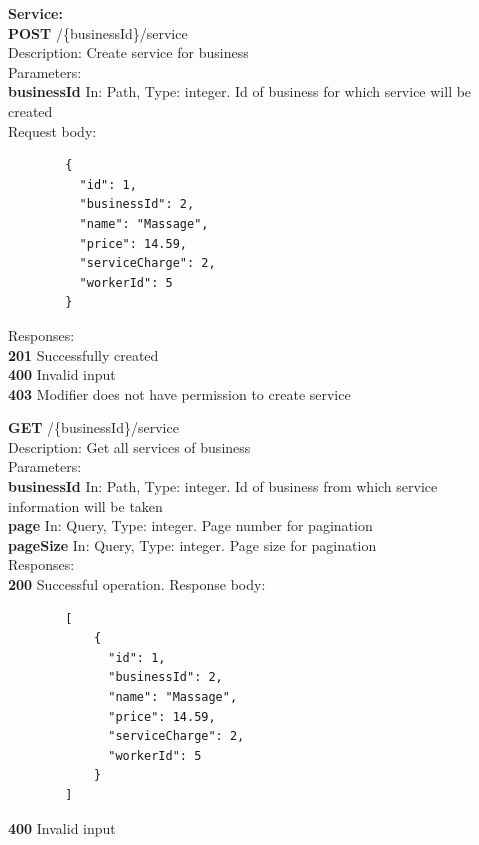 \documentclass[11pt,a4paper,pdftex]{article}
\begin{document}
\textbf{Service:}\\
\hspace*{1em}\textbf{POST} /\{businessId\}/service\\
\hspace*{2em}Description: Create service for business\\
\hspace*{2em}Parameters:\\
\hspace*{3em}\textbf{businessId} In: Path, Type: integer. Id of business for which service will be created\\
\hspace*{2em}Request body:
\begin{verbatim}
        {
          "id": 1,
          "businessId": 2,
          "name": "Massage",
          "price": 14.59,
          "serviceCharge": 2,
          "workerId": 5
        }
\end{verbatim}
\hspace*{2em}Responses:\\
\hspace*{3em}\textbf{201} Successfully created\\
\hspace*{3em}\textbf{400} Invalid input\\
\hspace*{3em}\textbf{403} Modifier does not have permission to create service

\hspace*{1em}\textbf{GET} /\{businessId\}/service\\
\hspace*{2em}Description: Get all services of business\\
\hspace*{2em}Parameters:\\
\hspace*{3em}\textbf{businessId} In: Path, Type: integer. Id of business from which service information will be taken\\
\hspace*{3em}\textbf{page} In: Query, Type: integer. Page number for pagination\\
\hspace*{3em}\textbf{pageSize} In: Query, Type: integer. Page size for pagination\\
\hspace*{2em}Responses:\\
\hspace*{3em}\textbf{200} Successful operation. Response body:
\begin{verbatim}
        [
            {
              "id": 1,
              "businessId": 2,
              "name": "Massage",
              "price": 14.59,
              "serviceCharge": 2,
              "workerId": 5
            }
        ]
\end{verbatim}
\hspace*{3em}\textbf{400} Invalid input
\end{document}
